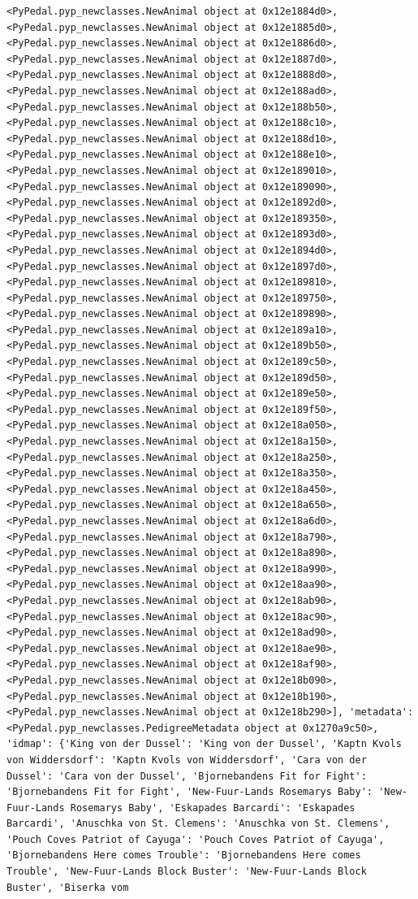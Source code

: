 \documentclass[
  letterpaper,
  DIV=11,
  numbers=noendperiod]{scrreprt}
\begin{document}
\begin{codelisting}
{\begin{verbatim}
<PyPedal.pyp_newclasses.NewAnimal object at 0x12e1884d0>, <PyPedal.pyp_newclasses.NewAnimal object at 0x12e1885d0>, <PyPedal.pyp_newclasses.NewAnimal object at 0x12e1886d0>, <PyPedal.pyp_newclasses.NewAnimal object at 0x12e1887d0>, <PyPedal.pyp_newclasses.NewAnimal object at 0x12e1888d0>, <PyPedal.pyp_newclasses.NewAnimal object at 0x12e188ad0>, <PyPedal.pyp_newclasses.NewAnimal object at 0x12e188b50>, <PyPedal.pyp_newclasses.NewAnimal object at 0x12e188c10>, <PyPedal.pyp_newclasses.NewAnimal object at 0x12e188d10>, <PyPedal.pyp_newclasses.NewAnimal object at 0x12e188e10>, <PyPedal.pyp_newclasses.NewAnimal object at 0x12e189010>, <PyPedal.pyp_newclasses.NewAnimal object at 0x12e189090>, <PyPedal.pyp_newclasses.NewAnimal object at 0x12e1892d0>, <PyPedal.pyp_newclasses.NewAnimal object at 0x12e189350>, <PyPedal.pyp_newclasses.NewAnimal object at 0x12e1893d0>, <PyPedal.pyp_newclasses.NewAnimal object at 0x12e1894d0>, <PyPedal.pyp_newclasses.NewAnimal object at 0x12e1897d0>, <PyPedal.pyp_newclasses.NewAnimal object at 0x12e189810>, <PyPedal.pyp_newclasses.NewAnimal object at 0x12e189750>, <PyPedal.pyp_newclasses.NewAnimal object at 0x12e189890>, <PyPedal.pyp_newclasses.NewAnimal object at 0x12e189a10>, <PyPedal.pyp_newclasses.NewAnimal object at 0x12e189b50>, <PyPedal.pyp_newclasses.NewAnimal object at 0x12e189c50>, <PyPedal.pyp_newclasses.NewAnimal object at 0x12e189d50>, <PyPedal.pyp_newclasses.NewAnimal object at 0x12e189e50>, <PyPedal.pyp_newclasses.NewAnimal object at 0x12e189f50>, <PyPedal.pyp_newclasses.NewAnimal object at 0x12e18a050>, <PyPedal.pyp_newclasses.NewAnimal object at 0x12e18a150>, <PyPedal.pyp_newclasses.NewAnimal object at 0x12e18a250>, <PyPedal.pyp_newclasses.NewAnimal object at 0x12e18a350>, <PyPedal.pyp_newclasses.NewAnimal object at 0x12e18a450>, <PyPedal.pyp_newclasses.NewAnimal object at 0x12e18a650>, <PyPedal.pyp_newclasses.NewAnimal object at 0x12e18a6d0>, <PyPedal.pyp_newclasses.NewAnimal object at 0x12e18a790>, <PyPedal.pyp_newclasses.NewAnimal object at 0x12e18a890>, <PyPedal.pyp_newclasses.NewAnimal object at 0x12e18a990>, <PyPedal.pyp_newclasses.NewAnimal object at 0x12e18aa90>, <PyPedal.pyp_newclasses.NewAnimal object at 0x12e18ab90>, <PyPedal.pyp_newclasses.NewAnimal object at 0x12e18ac90>, <PyPedal.pyp_newclasses.NewAnimal object at 0x12e18ad90>, <PyPedal.pyp_newclasses.NewAnimal object at 0x12e18ae90>, <PyPedal.pyp_newclasses.NewAnimal object at 0x12e18af90>, <PyPedal.pyp_newclasses.NewAnimal object at 0x12e18b090>, <PyPedal.pyp_newclasses.NewAnimal object at 0x12e18b190>, <PyPedal.pyp_newclasses.NewAnimal object at 0x12e18b290>], 'metadata': <PyPedal.pyp_newclasses.PedigreeMetadata object at 0x1270a9c50>, 'idmap': {'King von der Dussel': 'King von der Dussel', 'Kaptn Kvols von Widdersdorf': 'Kaptn Kvols von Widdersdorf', 'Cara von der Dussel': 'Cara von der Dussel', 'Bjornebandens Fit for Fight': 'Bjornebandens Fit for Fight', 'New-Fuur-Lands Rosemarys Baby': 'New-Fuur-Lands Rosemarys Baby', 'Eskapades Barcardi': 'Eskapades Barcardi', 'Anuschka von St. Clemens': 'Anuschka von St. Clemens', 'Pouch Coves Patriot of Cayuga': 'Pouch Coves Patriot of Cayuga', 'Bjornebandens Here comes Trouble': 'Bjornebandens Here comes Trouble', 'New-Fuur-Lands Block Buster': 'New-Fuur-Lands Block Buster', 'Biserka vom 
\end{verbatim}}
\end{codelisting}
\end{document}
